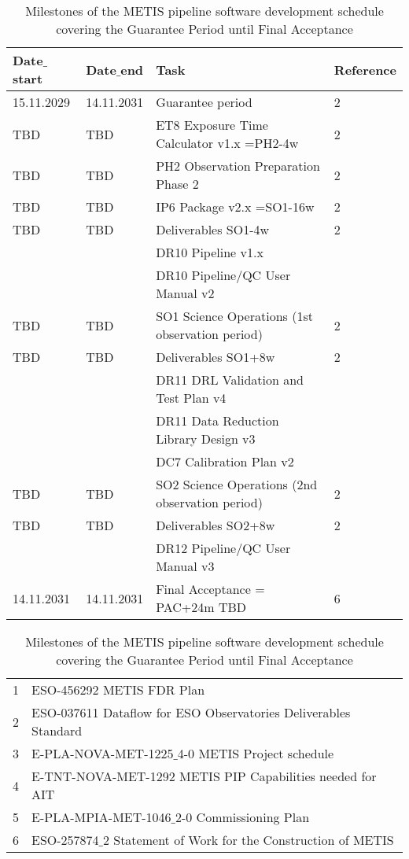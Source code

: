 \begin{table}[h!]
    \caption[Development schedule]{Milestones of the METIS pipeline software development schedule covering the Guarantee Period until Final Acceptance}
  \label{tab:development_schedule3}

\centering
\scriptsize
\begin{tabularx}{\textwidth}{llll}

\hline
Date$\_$start &	Date$\_$end   &	Task                            &		Reference \\
\hline\hline
15.11.2029 & 14.11.2031 & Guarantee period 					               & 2 \\
\hline
TBD    & TBD   & ET8 Exposure Time Calculator v1.x =PH2-4w		           & 2 \\
\hline
TBD    & TBD   & PH2 Observation Preparation Phase 2    		           & 2 \\
\hline
TBD    & TBD   & IP6 Package v2.x =SO1-16w				                   & 2 \\
\hline
TBD    & TBD   & Deliverables SO1-4w                                & 2 \\
   &           & DR10 Pipeline v1.x					             &	\\
   &		    & DR10 Pipeline/QC User Manual v2		    	     &	\\
\hline
TBD    & TBD   & SO1 Science Operations (1st observation period) 	& 2 \\
\hline
TBD    & TBD   & Deliverables SO1+8w                                & 2 \\
   &	 	    & DR11 DRL Validation and Test Plan v4	  		     &	\\
   &		    & DR11 Data Reduction Library Design v3	  		     &	\\
   &		    & DC7 Calibration Plan v2					         &	\\
\hline
TBD    & TBD   & SO2 Science Operations (2nd observation period) 	& 2 \\
\hline
TBD    & TBD   & Deliverables SO2+8w                                & 2 \\
   &		    & DR12 Pipeline/QC User Manual v3				     &	\\
\hline
14.11.2031 & 14.11.2031 & Final Acceptance  = PAC+24m  TBD			& 6 \\
\hline\hline
\end{tabularx}			
\tiny
\begin{tabularx}{\textwidth}{ll}
1 & ESO-456292 METIS FDR Plan  \\
2 & ESO-037611 Dataflow for ESO Observatories Deliverables Standard \\
3 & E-PLA-NOVA-MET-1225$\_$4-0 METIS Project schedule \\
4 & E-TNT-NOVA-MET-1292 METIS PIP Capabilities needed for AIT \\ 
5 & E-PLA-MPIA-MET-1046$\_$2-0 Commissioning Plan \\
6 & ESO-257874$\_$2 Statement of Work for the Construction of METIS \\
\end{tabularx} 
\end{table}


